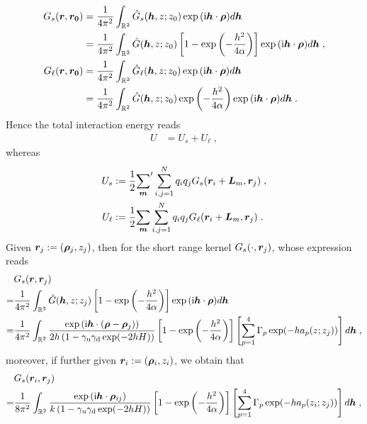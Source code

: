 \begin{equation*}
\begin{aligned}
 G_s(\boldsymbol{r}, \boldsymbol{r_0})&=   \frac{1}{4\pi^2}\int_{\mathbb{R}^2} \hat{G}_s(\boldsymbol{h}, z; z_0)\exp{(\mathrm{i} \boldsymbol{h} \cdot \boldsymbol{\rho})} d \boldsymbol{h}\\
 &= \frac{1}{4\pi^2}\int_{\mathbb{R}^2} \hat{G}(\boldsymbol{h}, z; z_0)\left[1-\exp\left(-\frac{h^2}{4\alpha}\right)\right]\exp{(\mathrm{i} \boldsymbol{h} \cdot \boldsymbol{\rho})} d \boldsymbol{h}\;,\\
  G_\ell(\boldsymbol{r}, \boldsymbol{r_0})&=   \frac{1}{4\pi^2}\int_{\mathbb{R}^2} \hat{G}_\ell(\boldsymbol{h}, z; z_0)\exp{(\mathrm{i} \boldsymbol{h} \cdot \boldsymbol{\rho})} d \boldsymbol{h}\\
 &= \frac{1}{4\pi^2}\int_{\mathbb{R}^2} \hat{G}(\boldsymbol{h}, z; z_0)\exp\left(-\frac{h^2}{4\alpha}\right)\exp{(\mathrm{i} \boldsymbol{h} \cdot \boldsymbol{\rho})} d \boldsymbol{h}\;.
\end{aligned}    
\end{equation*}
Hence the total interaction energy reads
\begin{align*}
   U & =   U_s+U_\ell\;,
\end{align*}
whereas
\begin{align}
U_s&:=    \frac{1}{2} {\sum_{\boldsymbol{m}}}^\prime \sum_{i, j = 1}^{N} q_i q_j G_s(\boldsymbol{r}_i+\bm{L}_m, \boldsymbol{r}_j)\;, \label{eq::U_s}\\
U_\ell&:=   \frac{1}{2} {\sum_{\boldsymbol{m}}}\sum_{i, j = 1}^{N} q_i q_j  G_\ell(\boldsymbol{r}_i+\bm{L}_m, \boldsymbol{r}_j)\;. \label{eq::U_l}
\end{align}
Given $\bm{r}_j:=(\bm{\rho}_j, z_j)$, then for the short range kernel $G_s(\cdot, \boldsymbol{r}_j)$, whose expression reads 
\begin{align*}
 &G_s(\boldsymbol{r}, \boldsymbol{r}_j)\\
 =&   \frac{1}{4\pi^2}\int_{\mathbb{R}^2} \hat{G}(\boldsymbol{h}, z; z_j)\left[1-\exp\left(-\frac{h^2}{4\alpha}\right)\right]\exp{(\mathrm{i} \boldsymbol{h} \cdot \boldsymbol{\rho})} d \boldsymbol{h}\\
 =& \frac{1}{4\pi^2}\int_{\mathbb{R}^2} \frac{ \exp{(\mathrm{i} \boldsymbol{h} \cdot (\boldsymbol{\rho}-\boldsymbol{\rho}_j))}}{2h \left(1-\gamma_{\mathrm{u}}\gamma_{\mathrm{d}}\exp(-2hH)\right)} \left[1-\exp\left(-\frac{h^2}{4\alpha}\right)\right]\left[\sum_{p=1}^4\Gamma_p\exp(-ha_p(z;z_j))\right]d \boldsymbol{h}\;,
\end{align*}
moreover, if further given $\boldsymbol{r}_i:=(\bm{\rho}_i, z_i)$, we obtain that 
\begin{align*}
   &G_s(\boldsymbol{r}_i, \boldsymbol{r}_j)\\
   =& \frac{1}{8\pi^2 }\int_{\mathbb{R}^2} \frac{ \exp{(\mathrm{i} \boldsymbol{h} \cdot \boldsymbol{\rho}_{ij})}}{k\left(1-\gamma_{\mathrm{u}}\gamma_{\mathrm{d}}\exp(-2hH)\right)} \left[1-\exp\left(-\frac{h^2}{4\alpha}\right)\right]\left[\sum_{p=1}^4\Gamma_p\exp(-ha_p(z_i;z_j))\right]d \boldsymbol{h}\;,
\end{align*}
